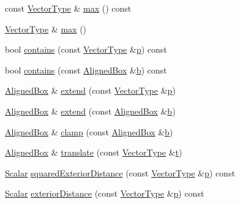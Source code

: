 \begin{DoxyCompactItemize}
\item 
const \hyperlink{class_aligned_box_a0c3d2a6c755e0ad65a6e45371a4079ef}{Vector\-Type} \& \hyperlink{class_aligned_box_abcbc173555fdbffbefe0009f97239fc9}{max} () const 
\item 
\hyperlink{class_aligned_box_a0c3d2a6c755e0ad65a6e45371a4079ef}{Vector\-Type} \& \hyperlink{class_aligned_box_a88949821507c10408e2bb92c7553555d}{max} ()
\item 
bool \hyperlink{class_aligned_box_a9fe04fe311174e0aae33a92900f357c7}{contains} (const \hyperlink{class_aligned_box_a0c3d2a6c755e0ad65a6e45371a4079ef}{Vector\-Type} \&\hyperlink{glext_8h_aa5367c14d90f462230c2611b81b41d23}{p}) const 
\item 
bool \hyperlink{class_aligned_box_ac2eb8ec1588ef691fc15159cdf6e2af8}{contains} (const \hyperlink{class_aligned_box}{Aligned\-Box} \&\hyperlink{glext_8h_a6eba317e3cf44d6d26c04a5a8f197dcb}{b}) const 
\item 
\hyperlink{class_aligned_box}{Aligned\-Box} \& \hyperlink{class_aligned_box_a6357c2a5afc2237fd07dd0bf8ef7939c}{extend} (const \hyperlink{class_aligned_box_a0c3d2a6c755e0ad65a6e45371a4079ef}{Vector\-Type} \&\hyperlink{glext_8h_aa5367c14d90f462230c2611b81b41d23}{p})
\item 
\hyperlink{class_aligned_box}{Aligned\-Box} \& \hyperlink{class_aligned_box_a814cbe6746ae280295b7265feb3d3c5f}{extend} (const \hyperlink{class_aligned_box}{Aligned\-Box} \&\hyperlink{glext_8h_a6eba317e3cf44d6d26c04a5a8f197dcb}{b})
\item 
\hyperlink{class_aligned_box}{Aligned\-Box} \& \hyperlink{class_aligned_box_a37cff54a3234079367c9545d2c9bf83a}{clamp} (const \hyperlink{class_aligned_box}{Aligned\-Box} \&\hyperlink{glext_8h_a6eba317e3cf44d6d26c04a5a8f197dcb}{b})
\item 
\hyperlink{class_aligned_box}{Aligned\-Box} \& \hyperlink{class_aligned_box_add3a910023672eff33b4def4098ebf94}{translate} (const \hyperlink{class_aligned_box_a0c3d2a6c755e0ad65a6e45371a4079ef}{Vector\-Type} \&\hyperlink{glext_8h_a00140d6f5c548b26daf170bf16e86a6d}{t})
\item 
\hyperlink{class_aligned_box_a9657f66d123142ede4a4c9c12768b187}{Scalar} \hyperlink{class_aligned_box_adec105272da7f1b10b28349f100adf9c}{squared\-Exterior\-Distance} (const \hyperlink{class_aligned_box_a0c3d2a6c755e0ad65a6e45371a4079ef}{Vector\-Type} \&\hyperlink{glext_8h_aa5367c14d90f462230c2611b81b41d23}{p}) const 
\item 
\hyperlink{class_aligned_box_a9657f66d123142ede4a4c9c12768b187}{Scalar} \hyperlink{class_aligned_box_a5eb5ad5bcd84a1947f374bf8a92849d1}{exterior\-Distance} (const \hyperlink{class_aligned_box_a0c3d2a6c755e0ad65a6e45371a4079ef}{Vector\-Type} \&\hyperlink{glext_8h_aa5367c14d90f462230c2611b81b41d23}{p}) const 

\end{DoxyCompactItemize}
